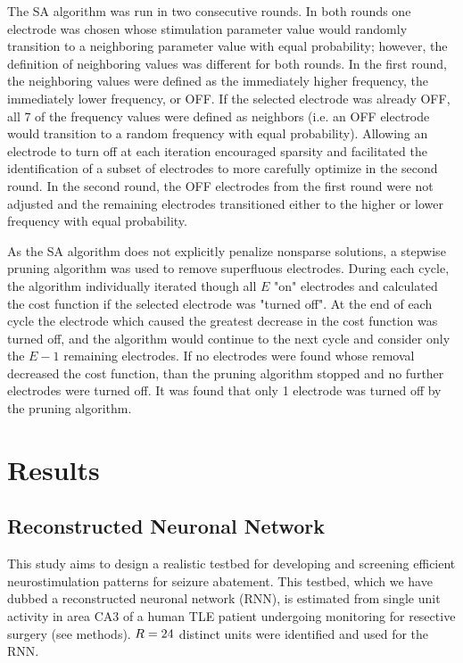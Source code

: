 \documentclass[11pt,a4paper,final]{article}
\begin{document}
The SA algorithm was run in two consecutive rounds.
In both rounds one electrode was chosen whose stimulation parameter value would randomly transition to a neighboring parameter value with equal probability; however, the definition of neighboring values was different for both rounds. 
In the first round, the neighboring values were defined as the immediately higher frequency, the immediately lower frequency, or OFF.
If the selected electrode was already OFF, all 7 of the frequency values were defined as neighbors (i.e. an OFF electrode would transition to a random frequency with equal probability).
Allowing an electrode to turn off at each iteration encouraged sparsity and facilitated the identification of a subset of electrodes to more carefully optimize in the second round.
In the second round, the OFF electrodes from the first round were not adjusted and the remaining electrodes transitioned either to the higher or lower frequency with equal probability.

As the SA algorithm does not explicitly penalize nonsparse solutions, a stepwise pruning algorithm was used to remove superfluous electrodes.
During each cycle, the algorithm individually iterated though all $E$ "on" electrodes and calculated the cost function if the selected electrode was "turned off".
At the end of each cycle the electrode which caused the greatest decrease in the cost function was turned off, and the algorithm would continue to the next cycle and consider only the $E-1$ remaining electrodes.
If no electrodes were found whose removal decreased the cost function, than the pruning algorithm stopped and no further electrodes were turned off.
It was found that only 1 electrode was turned off by the pruning algorithm.


\section{Results \label{results}}

    \subsection{Reconstructed Neuronal Network}

This study aims to design a realistic testbed for developing and screening efficient neurostimulation patterns for seizure abatement.
This testbed, which we have dubbed a reconstructed neuronal network (RNN), is estimated from single unit activity in area CA3 of a human TLE patient undergoing monitoring for resective surgery (see methods).
$R=24{}$ distinct units were identified and used for the RNN. 
\end{document}
